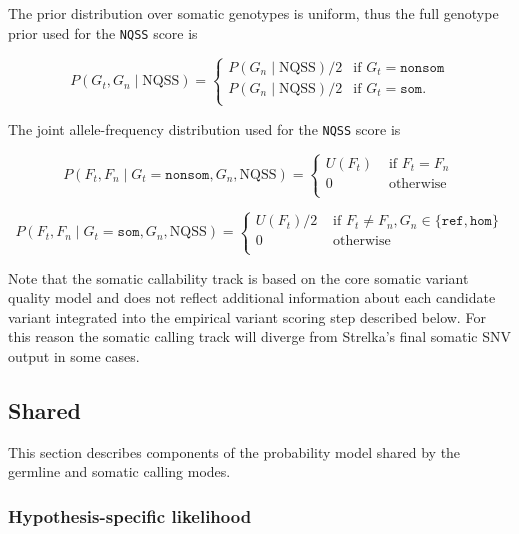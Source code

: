 \documentclass{article}
\begin{document}
The prior distribution over somatic genotypes is uniform, thus the full genotype prior used for the \texttt{NQSS} score is

\begin{equation*}
P(G_t, G_n \mid \text{NQSS}) =
\begin{cases}
P(G_n \mid \text{NQSS})/2 & \text{if } G_t = \texttt{nonsom} \\
P(G_n \mid \text{NQSS})/2 & \text{if } G_t = \texttt{som}. \\
\end{cases}
\end{equation*}


The joint allele-frequency distribution used for the \texttt{NQSS} score is

\begin{equation*}
P(F_t, F_n \mid G_t = \texttt{nonsom}, G_n, \text{NQSS})=
\begin{cases}
U(F_t) & \text{ if } F_t = F_n \\
0 & \text{ otherwise } \\
\end{cases}
\end{equation*}

\begin{equation*}
P(F_t, F_n \mid G_t = \texttt{som}, G_n, \text{NQSS})=
\begin{cases}
U(F_t)/2 & \text{ if } F_t \neq F_n, G_n \in \{\texttt{ref},\texttt{hom}\}  \\
0 & \text{ otherwise } \\
\end{cases}
\end{equation*}

Note that the somatic callability track is based on the core somatic variant quality model and does not reflect additional information about each candidate variant integrated into the empirical variant scoring step described below. For this reason the somatic calling track will diverge from Strelka's final somatic SNV output in some cases.

\subsection{Shared}
\label{sec:shared}
This section describes components of the probability model shared by the germline and somatic calling modes.

\subsubsection{Hypothesis-specific likelihood}
\label{sec:shared_lik}
\end{document}
